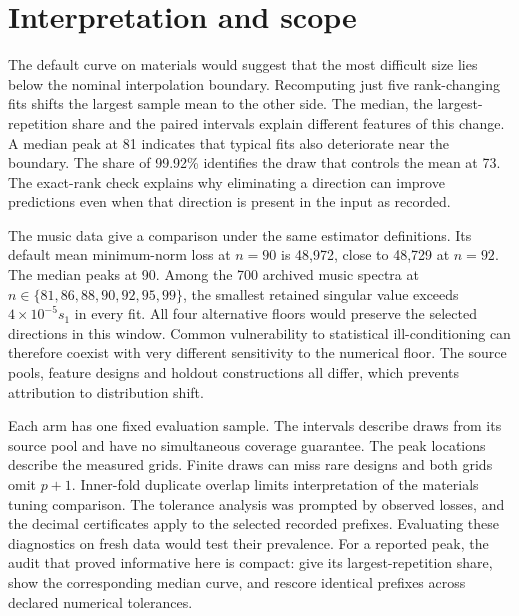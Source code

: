 \section{Interpretation and scope}
The default curve on materials would suggest that the most difficult size lies below the nominal interpolation boundary. Recomputing just five rank-changing fits shifts the largest sample mean to the other side. The median, the largest-repetition share and the paired intervals explain different features of this change. A median peak at 81 indicates that typical fits also deteriorate near the boundary. The share of 99.92\% identifies the draw that controls the mean at 73. The exact-rank check explains why eliminating a direction can improve predictions even when that direction is present in the input as recorded.

The music data give a comparison under the same estimator definitions. Its default mean minimum-norm loss at $n=90$ is 48,972, close to 48,729 at $n=92$. The median peaks at 90. Among the 700 archived music spectra at $n\in\{81,86,88,90,92,95,99\}$, the smallest retained singular value exceeds $4\times10^{-5}s_1$ in every fit. All four alternative floors would preserve the selected directions in this window. Common vulnerability to statistical ill-conditioning can therefore coexist with very different sensitivity to the numerical floor. The source pools, feature designs and holdout constructions all differ, which prevents attribution to distribution shift.

Each arm has one fixed evaluation sample. The intervals describe draws from its source pool and have no simultaneous coverage guarantee. The peak locations describe the measured grids. Finite draws can miss rare designs and both grids omit $p+1$. Inner-fold duplicate overlap limits interpretation of the materials tuning comparison. The tolerance analysis was prompted by observed losses, and the decimal certificates apply to the selected recorded prefixes. Evaluating these diagnostics on fresh data would test their prevalence. For a reported peak, the audit that proved informative here is compact: give its largest-repetition share, show the corresponding median curve, and rescore identical prefixes across declared numerical tolerances.
